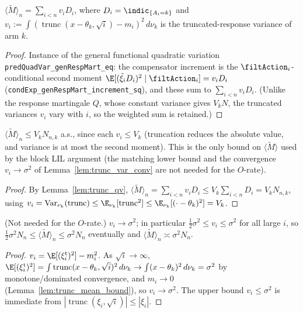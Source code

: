\begin{lemma}\label{lem:trunc_qv}
\leanok
{}
$\langle\tilde M\rangle_n=\sum_{i<n}v_i D_i$, where $D_i=\indic_{\{A_i=k\}}$ and
$v_i:=\int(\operatorname{trunc}(x-\theta_k,\sqrt i)-m_i)^2\,d\nu_k$ is the truncated-response
variance of arm $k$.
\end{lemma}
\begin{proof}\leanok
{}
Instance of the general functional quadratic variation
\texttt{predQuadVar\_genRespMart\_eq}: the compensator increment is the $\filtAction_i$-conditional
second moment $\E[(\tilde\xi_i D_i)^2\mid\filtAction_i]=v_i D_i$
(\texttt{condExp\_genRespMart\_increment\_sq}), and these sum to $\sum_{i<n}v_i D_i$. (Unlike the
response martingale $Q$, whose constant variance gives $V_k N$, the truncated variances $v_i$ vary
with $i$, so the weighted sum is retained.)
\end{proof}

\begin{lemma}\label{lem:trunc_qv_le}
\leanok
{}
$\langle\tilde M\rangle_n\le V_k N_{n,k}$ a.s., since each $v_i\le V_k$ (truncation reduces the
absolute value, and variance is at most the second moment). This is the only bound on
$\langle\tilde M\rangle$ used by the block LIL argument (the matching lower bound and the
convergence $v_i\to\sigma^2$ of Lemma~\ref{lem:trunc_var_conv} are not needed for the $O$-rate).
\end{lemma}
\begin{proof}\leanok
{}
By Lemma~\ref{lem:trunc_qv}, $\langle\tilde M\rangle_n=\sum_{i<n}v_i D_i\le V_k\sum_{i<n}D_i
=V_k N_{n,k}$, using $v_i=\operatorname{Var}_{\nu_k}(\operatorname{trunc})\le
\E_{\nu_k}[\operatorname{trunc}^2]\le\E_{\nu_k}[(\cdot-\theta_k)^2]=V_k$.
\end{proof}

\begin{lemma}\label{lem:trunc_var_conv}
(Not needed for the $O$-rate.) $v_i\to\sigma^2$; in particular $\tfrac12\sigma^2\le v_i\le\sigma^2$
for all large $i$, so
$\tfrac12\sigma^2 N_n\le\langle\tilde M\rangle_n\le\sigma^2 N_n$ eventually and
$\langle\tilde M\rangle_n\asymp\sigma^2 N_n$.
\end{lemma}
\begin{proof}
$v_i=\E[(\xi_i^{\mathrm t})^2]-m_i^2$. As $\sqrt i\to\infty$, $\E[(\xi_i^{\mathrm t})^2]
=\int\operatorname{trunc}(x-\theta_k,\sqrt i)^2\,d\nu_k\to\int(x-\theta_k)^2\,d\nu_k=\sigma^2$
by monotone/dominated convergence, and $m_i\to0$ (Lemma~\ref{lem:trunc_mean_bound}), so
$v_i\to\sigma^2$. The upper bound $v_i\le\sigma^2$ is immediate from
$|\operatorname{trunc}(\xi_i,\sqrt i)|\le|\xi_i|$.
\end{proof}

